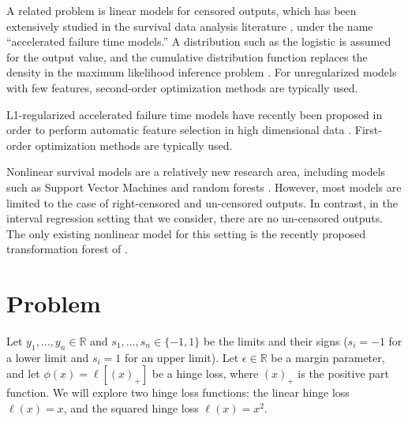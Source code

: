 \documentclass{article}
\begin{document}
A related problem is linear models for censored outputs, which has
been extensively studied in the survival data analysis literature
\citep{Wei1992}, under the name ``accelerated failure time models.''
A distribution such as the logistic is assumed for the output value,
and the cumulative distribution function replaces the density in the
maximum likelihood inference problem \citep{log-logistic}. For
unregularized models with few features, second-order optimization
methods are typically used. 

L1-regularized accelerated failure time models have recently been
proposed in order to perform automatic feature selection in high
dimensional data \citep{cai-regularized-aft,
  huang-regularized-aft}. First-order optimization methods are
typically used. 

Nonlinear survival models are a relatively new research area,
including models such as Support Vector Machines \citep{kssvm} and
random forests \citep{survival-ensembles}. However, most models are
limited to the case of right-censored and un-censored outputs. In
contrast, in the interval regression setting that we consider, there
are no un-censored outputs. The only existing nonlinear model for this
setting is the recently proposed transformation forest of
\citet{transformation-forests}.

\section{Problem}
Let $y_1,\dots,y_n\in\mathbb R$ and $s_1,\dots,s_n\in\{-1,1\}$ be the
limits and their signs ($s_i=-1$ for a lower limit and $s_i=1$ for an
upper limit). Let $\epsilon\in\mathbb R$ be a margin parameter, and
let $\phi(x)=\ell[(x)_+]$ be a hinge loss, where $(x)_+$ is the
positive part function. We will explore two hinge loss functions: the
linear hinge loss $\ell(x)=x$, and the squared hinge loss
$\ell(x)=x^2$.
\end{document}
